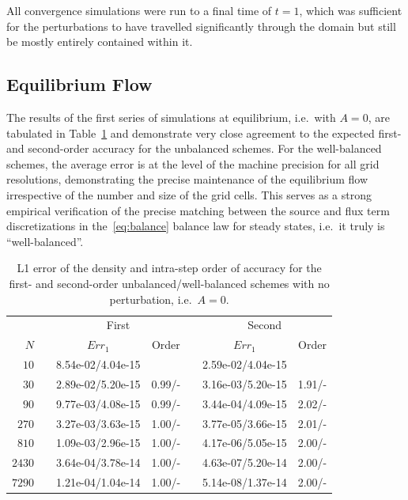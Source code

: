 All convergence simulations were run to a final time of $t=1$, which was sufficient for the perturbations to have travelled significantly through the domain but still be mostly entirely contained within it.

\subsection{Equilibrium Flow}

The results of the first series of simulations at equilibrium, i.e.\ with $A=0$, are tabulated in Table~\ref{table:OVS_A0} and demonstrate very close agreement to the expected first- and second-order accuracy for the unbalanced schemes. For the well-balanced schemes, the average error is at the level of the machine precision for all grid resolutions, demonstrating the precise maintenance of the equilibrium flow irrespective of the number and size of the grid cells. This serves as a strong empirical verification of the precise matching between the source and flux term discretizations in the~\eqref{eq:balance} balance law for steady states, i.e.\ it truly is ``well-balanced''.

\begin{table}\centering
\caption{L1 error of the density and intra-step order of accuracy for the first- and second-order unbalanced/well-balanced schemes with no perturbation, i.e.\ $A=0$.}
\label{table:OVS_A0}
\begin{tabular}{@{}rcccccc@{}}\toprule
& \phantom{a} & \multicolumn{2}{c}{First} & \phantom{ab} & \multicolumn{2}{c}{Second}\\
\cmidrule{3-4} \cmidrule{6-7}
$N$ && $Err_1$ & Order && $Err_1$ & Order\\ \midrule
$10$ && 8.54e-02/4.04e-15 &&& 2.59e-02/4.04e-15 &\\
$30$ && 2.89e-02/5.20e-15 & 0.99/- && 3.16e-03/5.20e-15 & 1.91/-\\
$90$ && 9.77e-03/4.08e-15 & 0.99/- && 3.44e-04/4.09e-15 & 2.02/-\\
$270$ && 3.27e-03/3.63e-15 & 1.00/- && 3.77e-05/3.66e-15 & 2.01/-\\
$810$ && 1.09e-03/2.96e-15 & 1.00/- && 4.17e-06/5.05e-15 & 2.00/-\\
$2430$ && 3.64e-04/3.78e-14 & 1.00/- && 4.63e-07/5.20e-14 & 2.00/-\\
$7290$ && 1.21e-04/1.04e-14 & 1.00/- && 5.14e-08/1.37e-14 & 2.00/-\\
\bottomrule
\end{tabular}
\end{table}

